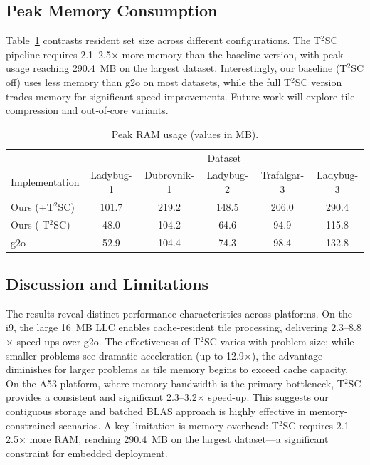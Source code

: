 \subsection{Peak Memory Consumption}
\label{subsec:results_ram}
Table~\ref{tab:peak_ram} contrasts resident set size across different configurations. 
The T$^{2}$SC pipeline requires 2.1–2.5$\times$ more memory than the baseline version, 
with peak usage reaching \SI{290.4}{MB} on the largest dataset. Interestingly, our baseline 
(T$^{2}$SC off) uses less memory than g2o on most datasets, while the full T$^{2}$SC version 
trades memory for significant speed improvements. Future work will explore tile compression 
and out‑of‑core variants.

\begin{table}[h]
\caption{Peak RAM usage (values in MB).}
\label{tab:peak_ram}
\centering
\begin{tabular}{@{}lccccc@{}}
\toprule
& \multicolumn{5}{c}{Dataset} \\
\cmidrule(lr){2-6}
Implementation & Ladybug-1 & Dubrovnik-1 & Ladybug-2 & Trafalgar-3 & Ladybug-3 \\
\midrule
Ours (+T$^{2}$SC) & 101.7 & 219.2 & 148.5 & 206.0 & 290.4 \\
Ours (-T$^{2}$SC) &  48.0 & 104.2 &  64.6 &  94.9 & 115.8 \\
g2o             &  52.9 &  104.4 &  74.3 &  98.4 & 132.8 \\
\bottomrule
\end{tabular}
\end{table}

\subsection{Discussion and Limitations}
\label{subsec:results_discussion}
The results reveal distinct performance characteristics across platforms. On the i9, the 
large \SI{16}{MB} LLC enables cache‑resident tile processing, delivering 2.3–8.8$\times$ 
speed‑ups over g2o. The effectiveness of T$^{2}$SC varies with problem size; while smaller 
problems see dramatic acceleration (up to 12.9$\times$), the advantage diminishes for larger 
problems as tile memory begins to exceed cache capacity. On the A53 platform, where memory 
bandwidth is the primary bottleneck, T$^{2}$SC provides a consistent and significant 
2.3–3.2$\times$ speed-up. This suggests our contiguous storage and batched BLAS approach is 
highly effective in memory-constrained scenarios. A key limitation is memory overhead: T$^{2}$SC 
requires 2.1–2.5$\times$ more RAM, reaching \SI{290.4}{MB} on the largest dataset—a significant 
constraint for embedded deployment.